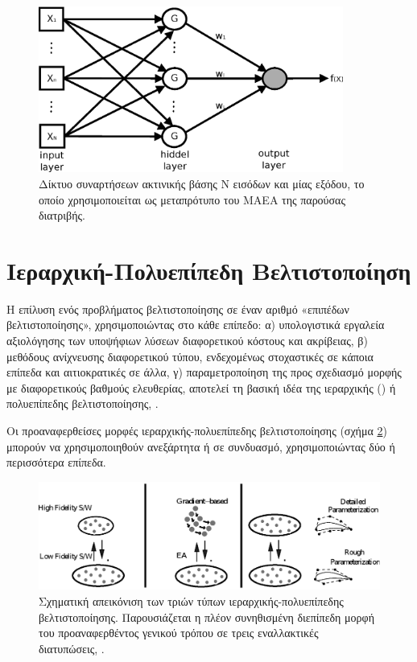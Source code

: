 \begin{figure}[h!]
\centering
\includegraphics[width=100mm]{RBF.eps} 
\caption{Δίκτυο συναρτήσεων ακτινικής βάσης Ν εισόδων και μίας εξόδου, το οποίο χρησιμοποιείται ως μεταπρότυπο του ΜΑΕΑ της παρούσας διατριβής.}
\label{rbf1}
\end{figure}

\section{Ιεραρχική-Πολυεπίπεδη Βελτιστοποίηση} 

Η επίλυση ενός προβλήματος βελτιστοποίησης σε έναν αριθμό «επιπέδων βελτιστοποίησης», χρησιμοποιώντας στο κάθε επίπεδο: α) υπολογιστικά εργαλεία αξιολόγησης των υποψήφιων λύσεων διαφορετικού κόστους και ακρίβειας, β) μεθόδους ανίχνευσης διαφορετικού τύπου, ενδεχομένως στοχαστικές σε κάποια επίπεδα και αιτιοκρατικές σε άλλα, γ) παραμετροποίηση της προς σχεδιασμό μορφής με διαφορετικούς βαθμούς ελευθερίας,  αποτελεί τη βασική ιδέα της ιεραρχικής () ή πολυεπίπεδης βελτιστοποίησης, \cite{phd_Kampolis,LTT_2_031,LTT_2_044,LTT_3_094,LTT_3_095}. 


Οι προαναφερθείσες μορφές ιεραρχικής-πολυεπίπεδης βελτιστοποίησης (σχήμα \ref{allheas}) μπορούν να χρησιμοποιηθούν ανεξάρτητα ή σε συνδυασμό, χρησιμοποιώντας δύο ή περισσότερα επίπεδα. 


\begin{figure}[h!]
    \centering
    \includegraphics[scale=0.8]{multimodes.eps}
    \caption{Σχηματική απεικόνιση των τριών τύπων ιεραρχικής-πολυεπίπεδης βελτιστοποίησης. Παρουσιάζεται η πλέον συνηθισμένη διεπίπεδη μορφή του προαναφερθέντος γενικού τρόπου σε τρεις εναλλακτικές διατυπώσεις, \cite{phd_Kampolis}.}
    \label{allheas}
\end{figure}      

